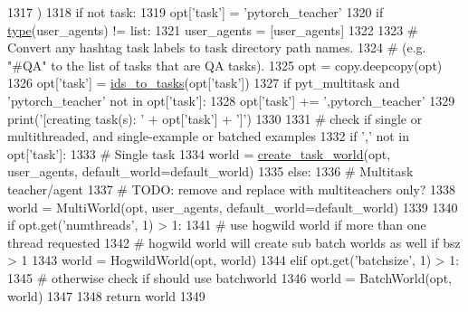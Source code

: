 \begin{DoxyCode}
1317     )
1318     \textcolor{keywordflow}{if} \textcolor{keywordflow}{not} task:
1319         opt[\textcolor{stringliteral}{'task'}] = \textcolor{stringliteral}{'pytorch\_teacher'}
1320     \textcolor{keywordflow}{if} \hyperlink{namespaceparlai_1_1agents_1_1tfidf__retriever_1_1build__tfidf_ad5dfae268e23f506da084a9efb72f619}{type}(user\_agents) != list:
1321         user\_agents = [user\_agents]
1322 
1323     \textcolor{comment}{# Convert any hashtag task labels to task directory path names.}
1324     \textcolor{comment}{# (e.g. "#QA" to the list of tasks that are QA tasks).}
1325     opt = copy.deepcopy(opt)
1326     opt[\textcolor{stringliteral}{'task'}] = \hyperlink{namespaceparlai_1_1tasks_1_1tasks_ad536d1295ca5ba2ecf3a48635b482087}{ids\_to\_tasks}(opt[\textcolor{stringliteral}{'task'}])
1327     \textcolor{keywordflow}{if} pyt\_multitask \textcolor{keywordflow}{and} \textcolor{stringliteral}{'pytorch\_teacher'} \textcolor{keywordflow}{not} \textcolor{keywordflow}{in} opt[\textcolor{stringliteral}{'task'}]:
1328         opt[\textcolor{stringliteral}{'task'}] += \textcolor{stringliteral}{',pytorch\_teacher'}
1329     print(\textcolor{stringliteral}{'[creating task(s): '} + opt[\textcolor{stringliteral}{'task'}] + \textcolor{stringliteral}{']'})
1330 
1331     \textcolor{comment}{# check if single or multithreaded, and single-example or batched examples}
1332     \textcolor{keywordflow}{if} \textcolor{stringliteral}{','} \textcolor{keywordflow}{not} \textcolor{keywordflow}{in} opt[\textcolor{stringliteral}{'task'}]:
1333         \textcolor{comment}{# Single task}
1334         world = \hyperlink{namespaceparlai_1_1core_1_1worlds_ae4ed098adcaad6ec7563e665485ccdcf}{create\_task\_world}(opt, user\_agents, default\_world=default\_world)
1335     \textcolor{keywordflow}{else}:
1336         \textcolor{comment}{# Multitask teacher/agent}
1337         \textcolor{comment}{# TODO: remove and replace with multiteachers only?}
1338         world = MultiWorld(opt, user\_agents, default\_world=default\_world)
1339 
1340     \textcolor{keywordflow}{if} opt.get(\textcolor{stringliteral}{'numthreads'}, 1) > 1:
1341         \textcolor{comment}{# use hogwild world if more than one thread requested}
1342         \textcolor{comment}{# hogwild world will create sub batch worlds as well if bsz > 1}
1343         world = HogwildWorld(opt, world)
1344     \textcolor{keywordflow}{elif} opt.get(\textcolor{stringliteral}{'batchsize'}, 1) > 1:
1345         \textcolor{comment}{# otherwise check if should use batchworld}
1346         world = BatchWorld(opt, world)
1347 
1348     \textcolor{keywordflow}{return} world
1349 \end{DoxyCode}
\mbox{\label{namespaceparlai_1_1core_1_1worlds_ae4ed098adcaad6ec7563e665485ccdcf}} 
